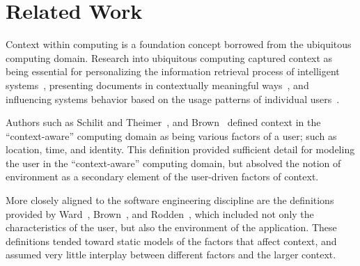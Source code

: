 
\section{Related Work}

Context within computing is a foundation concept borrowed from the ubiquitous computing domain. Research into ubiquitous computing captured context as being essential for personalizing the information retrieval process of intelligent systems~\cite{Freeman:1996}, presenting documents in contextually meaningful ways~\cite{Dourish:2000}, and influencing systems behavior based on the usage patterns of individual users~\cite{Cheverst:2000}. 

Authors such as Schilit and Theimer~\cite{Schilit:1994b}, and Brown~\cite{Brown:1995} defined context in the ``context-aware'' computing domain as being various factors of a user; such as location, time, and identity. This definition provided sufficient detail for modeling the user in the ``context-aware'' computing domain, but absolved the notion of environment as a secondary element of the user-driven factors of context.


More closely aligned to the software engineering discipline are the definitions provided by Ward~\cite{Ward:1997}, Brown~\cite{Brown:1995}, and Rodden~\cite{Rodden:1998}, which included not only the characteristics of the user, but also the environment of the application. These definitions tended toward static models of the factors that affect context, and assumed very little interplay between different factors and the larger context.


